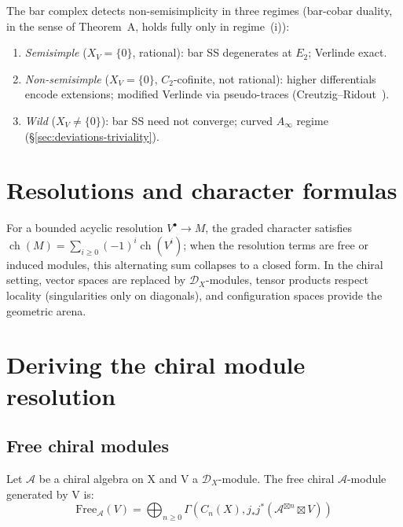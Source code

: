 \begin{remark}
\label{rem:non-semisimple-tensor}
The bar complex detects non-semisimplicity in three regimes
(bar-cobar duality, in the sense of Theorem~A, holds fully only
in regime~(i)):
\begin{enumerate}[label=\textup{(\roman*)}]
\item \emph{Semisimple} ($X_V = \{0\}$, rational): bar SS degenerates at $E_2$; Verlinde exact.
\item \emph{Non-semisimple} ($X_V = \{0\}$, $C_2$-cofinite, not rational): higher differentials encode extensions; modified Verlinde via pseudo-traces (Creutzig--Ridout~\cite{CreutzigRidout2013}).
\item \emph{Wild} ($X_V \neq \{0\}$): bar SS need not converge; curved $A_\infty$ regime (\S\ref{sec:deviations-triviality}).
\end{enumerate}
\end{remark}

\section{Resolutions and character formulas}\label{sec:complete-calculations}

For a bounded acyclic resolution $V^\bullet \to M$, the graded character satisfies $\operatorname{ch}(M) = \sum_{i \geq 0} (-1)^i \operatorname{ch}(V^i)$; when the resolution terms are free or induced modules, this alternating sum collapses to a closed form.  In the chiral setting, vector spaces are replaced by $\mathcal{D}_X$-modules, tensor products respect locality (singularities only on diagonals), and configuration spaces provide the geometric arena.

\section{Deriving the chiral module resolution}\label{sec:chiral-module-resolution}

\subsection{Free chiral modules}

\begin{lemma}\label{lem:free-chiral-module-structure}
Let $\mathcal{A}$ be a chiral algebra on X and V a $\mathcal{D}_X$-module. The free chiral $\mathcal{A}$-module generated by V is:
\[
\text{Free}_{\mathcal{A}}(V) = \bigoplus_{n \geq 0} \Gamma(C_n(X), j_*j^*(\mathcal{A}^{\boxtimes n} \boxtimes V))
\]
\end{lemma}

